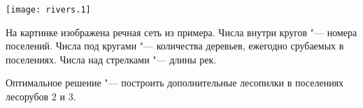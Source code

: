 \begin{center}
\texttt{[image: rivers.1]}
\end{center}

На картинке изображена речная сеть из примера.
Числа внутри кругов "--- номера поселений.
Числа под кругами "--- количества деревьев, ежегодно срубаемых в поселениях.
Числа над стрелками "--- длины рек.

Оптимальное решение "--- построить дополнительные лесопилки
в поселениях лесорубов $2$ и $3$.
